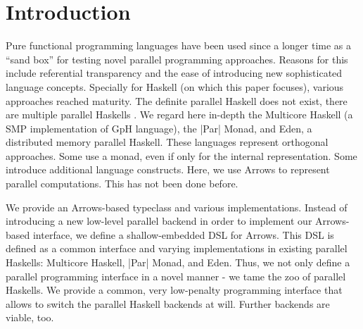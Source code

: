 
\section{Introduction}
\label{sec:introduction}
%
%
%

Pure functional programming languages have been used
since a longer time as a ``sand box'' for testing novel parallel
programming approaches. Reasons for this include referential
transparency and the ease of introducing new sophisticated language
concepts. Specially for Haskell (on which this paper focuses), various
approaches reached maturity. The definite parallel Haskell does not
exist, there are multiple parallel Haskells . We regard here in-depth
the Multicore Haskell (a SMP implementation of GpH language), the
|Par| Monad, and Eden, a distributed memory parallel Haskell. These
languages represent orthogonal approaches. Some use a monad, even if
only for the internal representation. Some introduce additional
language constructs. 
Here, we use Arrows to represent parallel computations. This has not
been done before.

We provide an Arrows-based typeclass and various implementations.
Instead of 
introducing a new low-level parallel backend in order to implement our
Arrows-based interface, we define a shallow-embedded DSL for Arrows. This DSL
is defined as a common interface and varying implementations in
existing parallel Haskells: Multicore Haskell, |Par| Monad, and
Eden. Thus, we not only define a parallel programming interface in a
novel manner - we tame the zoo of parallel Haskells. We provide a
common, very low-penalty programming interface that allows to switch
the parallel Haskell backends at will. Further backends are viable, too.

